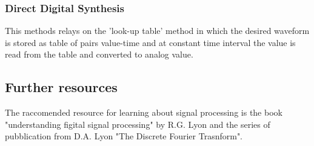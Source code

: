 \subsubsection{Direct Digital Synthesis}

This methods relays on the 'look-up table' method in which the desired waveform is stored as table of pairs value-time and at constant time interval the value is read from the table and converted to analog value.

\subsection{Further resources}

The raccomended resource for learning about signal processing is the book "understanding figital signal processing" by R.G. Lyon and the series of pubblication from D.A. Lyon "The Discrete Fourier Trasnform".